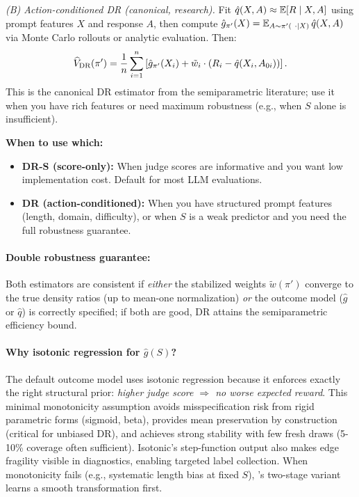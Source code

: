 \emph{(B) Action-conditioned DR (canonical, research).} Fit $\hat{q}(X,A) \approx \operatorname{\mathbb{E}}[R \mid X, A]$ using prompt features $X$ and response $A$, then compute $\hat{g}_{\pi'}(X) = \operatorname{\mathbb{E}}_{A \sim \pi'(\ \cdot \mid X)} \hat{q}(X, A)$ via Monte Carlo rollouts or analytic evaluation. Then:
\begin{equation}
\widehat{V}_{\text{DR}}(\pi') = \frac{1}{n} \sum_{i=1}^n \left[ \hat{g}_{\pi'}(X_i) + \tilde{w}_i \cdot (R_i - \hat{q}(X_i, A_{0i})) \right].
\end{equation}
This is the canonical DR estimator from the semiparametric literature; use it when you have rich features or need maximum robustness (e.g., when $S$ alone is insufficient).

\textbf{When to use which:}
\begin{itemize}
\item \textbf{DR-S (score-only):} When judge scores are informative and you want low implementation cost. Default for most LLM evaluations.
\item \textbf{DR (action-conditioned):} When you have structured prompt features (length, domain, difficulty), or when $S$ is a weak predictor and you need the full robustness guarantee.
\end{itemize}

\paragraph{Double robustness guarantee:} Both estimators are consistent if \emph{either} the stabilized weights $\tilde{w}(\pi')$ converge to the true density ratios (up to mean-one normalization) \emph{or} the outcome model ($\hat{g}$ or $\hat{q}$) is correctly specified; if both are good, DR attains the semiparametric efficiency bound.

\paragraph{Why isotonic regression for $\hat{g}(S)$?} The default outcome model uses isotonic regression because it enforces exactly the right structural prior: \emph{higher judge score $\Rightarrow$ no worse expected reward}. This minimal monotonicity assumption avoids misspecification risk from rigid parametric forms (sigmoid, beta), provides mean preservation by construction (critical for unbiased DR), and achieves strong stability with few fresh draws (5-10\% coverage often sufficient). Isotonic's step-function output also makes edge fragility visible in diagnostics, enabling targeted label collection. When monotonicity fails (e.g., systematic length bias at fixed $S$), \autocal{}'s two-stage variant learns a smooth transformation first.


